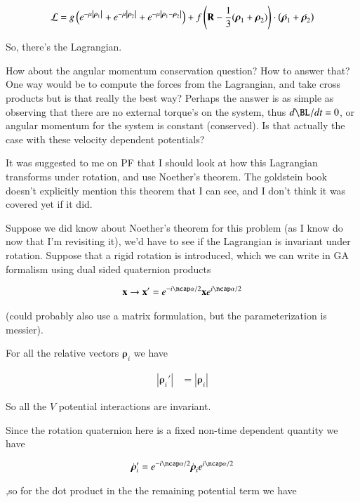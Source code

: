 \documentclass{article}
\newcommand{\Brho}[0]{\boldsymbol{\rho}}
\newcommand{\LL}[0]{\mathcal{L}}
\newcommand{\Abs}[1]{\left\lvert{#1}\right\rvert}
\begin{document}
\begin{equation*}
\LL =
g \left( e^{-\mu \Abs{\Brho_1}} + e^{-\mu \Abs{\Brho_2}} + e^{-\mu \Abs{ \Brho_1 - \Brho_2 }} \right)
+ f \left(\BR - \inv{3}(\Brho_1 + \Brho_2) \right) \cdot \left( \dot{\Brho_1} + \dot{\Brho_2} \right)
\end{equation*}

So, there's the Lagrangian.

How about the angular momentum conservation question?  How to answer that?  One way would be to compute the forces from the Lagrangian, and take cross products but is that really the best way?  Perhaps the answer is as simple as observing that there are no external torque's on the system, thus $d\BL/dt = 0$, or angular momentum for the system is constant (conserved).  Is that actually the case 
with these velocity dependent potentials?

It was suggested to me on PF that I should look at how this Lagrangian transforms under rotation, and use Noether's theorem.
The goldstein book doesn't explicitly mention this theorem that I can see, and I don't think it was covered yet if it did.

Suppose we did know about Noether's theorem for this problem (as I know do now that I'm revisiting it), we'd have to
see if the Lagrangian is invariant under rotation.  Suppose that a rigid rotation is introduced, which we can write in GA
formalism using dual sided quaternion products

\begin{align*}
\Bx \rightarrow \Bx' = e^{-i\ncap \alpha/2} \Bx e^{i\ncap\alpha/2}
\end{align*}

(could probably also use a matrix formulation, but the parameterization is messier).

For all the relative vectors $\Brho_i$ we have

\begin{align*}
\Abs{\Brho_i'} &= \Abs{\Brho_i}
\end{align*}

So all the $V$ potential interactions are invariant.  

Since the rotation quaternion here is a fixed non-time dependent quantity we have

\begin{align*}
\dot{\Brho}_i' = e^{-i\ncap \alpha/2} \dot{\Brho}_i e^{i\ncap\alpha/2}
\end{align*}

,so for the dot product in the the remaining potential term we have
\end{document}
